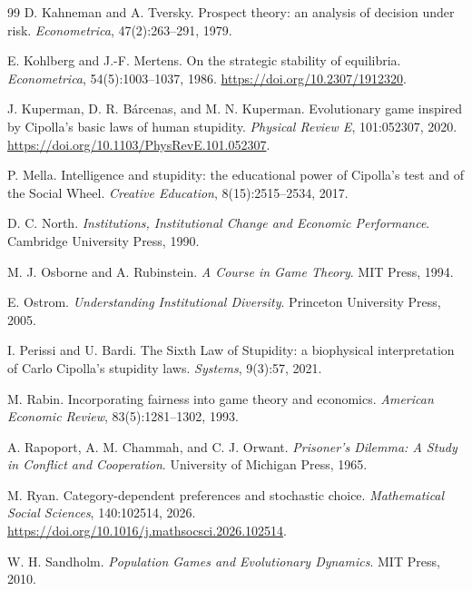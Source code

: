 \documentclass[a4paper,fleqn]{cas-dc}
\theoremstyle{remark}
\begin{document}
\begin{thebibliography}{99}
D. Kahneman and A. Tversky.
Prospect theory: an analysis of decision under risk.
\emph{Econometrica}, 47(2):263--291, 1979.

E. Kohlberg and J.-F. Mertens.
On the strategic stability of equilibria.
\emph{Econometrica}, 54(5):1003--1037, 1986.
\url{https://doi.org/10.2307/1912320}.

J. Kuperman, D. R. B\'{a}rcenas, and M. N. Kuperman.
Evolutionary game inspired by Cipolla's basic laws of human stupidity.
\emph{Physical Review E}, 101:052307, 2020.
\url{https://doi.org/10.1103/PhysRevE.101.052307}.

P. Mella.
Intelligence and stupidity: the educational power of Cipolla's test and of the Social Wheel.
\emph{Creative Education}, 8(15):2515--2534, 2017.

D. C. North.
\emph{Institutions, Institutional Change and Economic Performance}.
Cambridge University Press, 1990.

M. J. Osborne and A. Rubinstein.
\emph{A Course in Game Theory}.
MIT Press, 1994.

E. Ostrom.
\emph{Understanding Institutional Diversity}.
Princeton University Press, 2005.

I. Perissi and U. Bardi.
The Sixth Law of Stupidity: a biophysical interpretation of Carlo Cipolla's stupidity laws.
\emph{Systems}, 9(3):57, 2021.

M. Rabin.
Incorporating fairness into game theory and economics.
\emph{American Economic Review}, 83(5):1281--1302, 1993.

A. Rapoport, A. M. Chammah, and C. J. Orwant.
\emph{Prisoner's Dilemma: A Study in Conflict and Cooperation}.
University of Michigan Press, 1965.

M. Ryan.
Category-dependent preferences and stochastic choice.
\emph{Mathematical Social Sciences}, 140:102514, 2026.
\url{https://doi.org/10.1016/j.mathsocsci.2026.102514}.

W. H. Sandholm.
\emph{Population Games and Evolutionary Dynamics}.
MIT Press, 2010.


\end{thebibliography}
\end{document}
